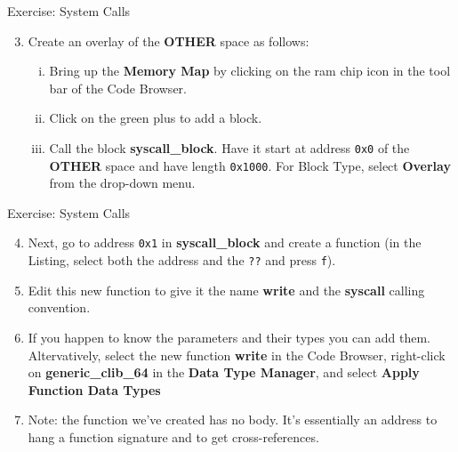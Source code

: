 \documentclass{beamer}
\begin{document}
\begin{frame}
\begin{block}{Exercise: System Calls}
\begin{enumerate}
\setcounter{enumi}{2}
\item Create an overlay of the \textbf{OTHER} space as follows:
\begin{enumerate}[(i)]
\item Bring up the \textbf{Memory Map} by clicking on the ram chip icon in the tool bar of the Code Browser.
\item Click on the green plus to add a block.
\item Call the block \textbf{syscall\_block}.  Have it start at address \texttt{0x0} of the \textbf{OTHER} space and have length \texttt{0x1000}.
For Block Type, select \textbf{Overlay} from the drop-down menu.
\end{enumerate}
\end{enumerate}
\end{block}
\end{frame}

\begin{frame}
\begin{block}{Exercise: System Calls}
\begin{enumerate}
\setcounter{enumi}{3}
\item Next, go to address \texttt{0x1} in \textbf{syscall\_block} and create a function (in the Listing, select both the address and the \texttt{??} and press \texttt{f}).
\item Edit this new function to give it the name \textbf{write} and the \textbf{syscall} calling convention.
\item If you happen to know the parameters and their types you can add them.  Altervatively, select the new function \textbf{write} in the Code Browser, right-click on 
\textbf{generic\_clib\_64} in the \textbf{Data Type Manager}, and select \textbf{Apply Function Data Types}
\item[] Note: the function we've created has no body. It's essentially an address to hang a function signature and to get cross-references.
\end{enumerate}
\end{block}
\end{frame}
\end{document}

